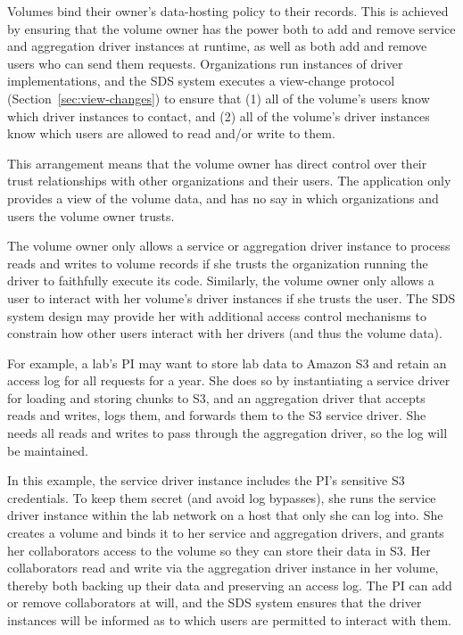 Volumes bind their owner's data-hosting policy to their records.  This is
achieved by ensuring that the volume owner has the power both to add and remove
service and aggregation driver instances at runtime, as well as both add and remove users
who can send them requests.  Organizations run instances of driver implementations, and the SDS
system executes a view-change protocol (Section~\ref{sec:view-changes}) to
ensure that (1) all of the volume's users know which driver instances to
contact, and (2) all of the volume's driver instances know which users are
allowed to read and/or write to them.

This arrangement means that the volume owner has direct control
over their trust relationships with other organizations and their users.
The application only provides a view of the volume data, and has no
say in which organizations and users the volume owner trusts.

The volume owner only allows a service or aggregation driver instance
to process reads and writes to
volume records if she trusts the organization running the driver to faithfully
execute its code.   Similarly, the volume owner only allows a user to
interact with her volume's driver instances if she trusts the user.  The SDS
system design may provide her with additional access control mechanisms to
constrain how other users interact with her drivers (and thus the volume data).

For example, a lab's PI may want to store lab data to Amazon S3 and retain an
access log for all requests for a year.  She does so by instantiating a service
driver for loading and storing chunks to S3, and an aggregation driver that
accepts reads and writes, logs them, and forwards them to the S3 service driver.
She needs all reads and writes to pass through the aggregation driver, so the
log will be maintained.

In this example, the service driver instance includes the PI's sensitive S3
credentials.  To keep them secret (and avoid log bypasses), 
she runs the service driver instance within the lab network on a host that only she can log
into.  She creates a volume and binds it to her service and aggregation drivers,
and grants her collaborators access to the volume so they can store their data
in S3.  Her collaborators read and write via the
aggregation driver instance in her volume, thereby both backing up their data 
and preserving an access log.  The PI can add or remove collaborators at
will, and the SDS system ensures that the driver instances will be informed
as to which users are permitted to interact with them.

